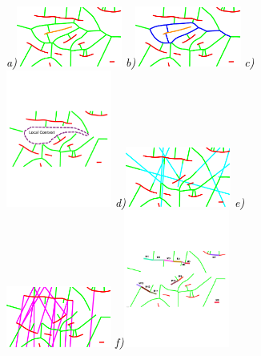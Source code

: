 \begin{appendices}
\begin{figure}[!ht]
\centering
{\footnotesize\textit{\textcolor{black}{a)}}}\includegraphics[width=0.31\textwidth]{figs/giraffe_before_shocks.pdf}
{\footnotesize\textit{\textcolor{black}{b)}}}\includegraphics[width=0.31\textwidth]{figs/giraffe_before_shocks_identify.pdf}
{\footnotesize\textit{\textcolor{black}{c)}}}\includegraphics[width=0.31\textwidth]{figs/giraffe_remove_shocks_identify.pdf}
{\footnotesize\textit{\textcolor{black}{d)}}}\includegraphics[width=0.31\textwidth]{figs/giraffe_reactive_shocks.pdf}
{\footnotesize\textit{\textcolor{black}{e)}}}\includegraphics[width=0.31\textwidth]{figs/giraffe_reactive_shocks_contact.pdf}
{\footnotesize\textit{\textcolor{black}{f)}}}\includegraphics[width=0.31\textwidth]{figs/giraffe_reactive_M_contours.pdf}

\end{figure}
\end{appendices}
